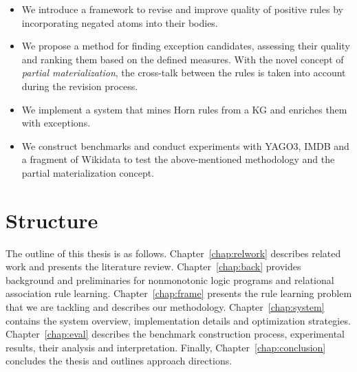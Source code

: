 \begin{itemize}
\item We introduce a framework to revise and improve quality of positive rules by incorporating negated atoms into their bodies.
\item We propose a method for finding exception candidates, assessing their quality and ranking them based on the defined measures. With the novel concept of \textit{partial materialization}, the cross-talk between the rules is taken into account during the revision process.
\item We implement a system that mines Horn rules from a KG and enriches them with exceptions.
\item We construct benchmarks and conduct experiments with YAGO3, IMDB and a fragment of Wikidata to test the above-mentioned methodology and the partial materialization concept.
\end{itemize}

\section{Structure}

The outline of this thesis is as follows. Chapter~\ref{chap:relwork} describes related work and presents the literature review. Chapter~\ref{chap:back} provides background and preliminaries for nonmonotonic logic programs and relational association rule learning. Chapter~\ref{chap:frame} presents the rule learning problem that we are tackling and describes our methodology. Chapter~\ref{chap:system} contains the system overview, implementation details and optimization strategies. Chapter~\ref{chap:eval} describes the benchmark construction process, experimental results, their analysis and interpretation. Finally, Chapter~\ref{chap:conclusion} concludes the thesis and outlines approach directions.